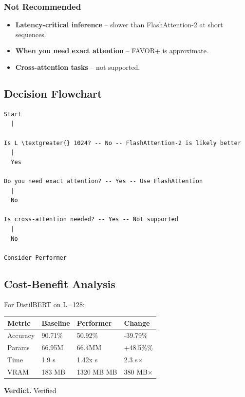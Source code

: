 \subsubsection{Not Recommended}

\begin{itemize}
\item \textbf{Latency-critical inference} -- slower than FlashAttention-2 at short
  sequences.
\item \textbf{When you need exact attention} -- FAVOR+ is approximate.
\item \textbf{Cross-attention tasks} -- not supported.

\end{itemize}
\subsection{Decision Flowchart}

\begin{lstlisting}
Start
  |
   
Is L \textgreater{} 1024? -- No -- FlashAttention-2 is likely better
  |
  Yes
   
Do you need exact attention? -- Yes -- Use FlashAttention
  |
  No
   
Is cross-attention needed? -- Yes -- Not supported
  |
  No
   
Consider Performer
\end{lstlisting}

\subsection{Cost-Benefit Analysis}

For DistilBERT on L=128:

\begin{table}[H]
\centering
\small
\begin{tabular}{llll}
\toprule
\textbf{Metric} & \textbf{Baseline} & \textbf{Performer} & \textbf{Change} \\
\midrule
Accuracy & 90.71\% & 50.92\% & -39.79\% \\
Params & 66.95M & 66.4MM & +48.5\%\% \\
Time & 1.9 s & 1.42x s & 2.3 s$\times$ \\
VRAM & 183 MB & 1320 MB MB & 380 MB$\times$ \\
\bottomrule
\end{tabular}
\end{table}

\textbf{Verdict.} Verified

